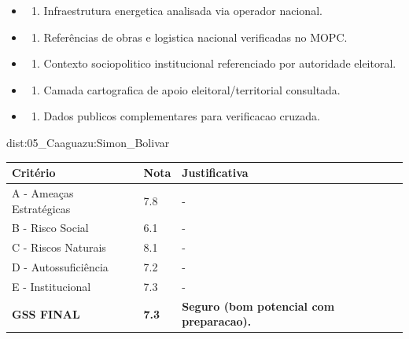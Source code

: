 {\begin{itemize}
\item
  \begin{enumerate}
  \def\labelenumi{\arabic{enumi})}
  \setcounter{enumi}{7}
  \tightlist
  \item
    Infraestrutura energetica analisada via operador nacional.
  \end{enumerate}
\item
  \begin{enumerate}
  \def\labelenumi{\arabic{enumi})}
  \setcounter{enumi}{8}
  \tightlist
  \item
    Referências de obras e logistica nacional verificadas no MOPC.
  \end{enumerate}
\item
  \begin{enumerate}
  \def\labelenumi{\arabic{enumi})}
  \setcounter{enumi}{9}
  \tightlist
  \item
    Contexto sociopolitico institucional referenciado por autoridade
    eleitoral.
  \end{enumerate}
\item
  \begin{enumerate}
  \def\labelenumi{\arabic{enumi})}
  \setcounter{enumi}{10}
  \tightlist
  \item
    Camada cartografica de apoio eleitoral/\allowbreak territorial consultada.
  \end{enumerate}
\item
  \begin{enumerate}
  \def\labelenumi{\arabic{enumi})}
  \setcounter{enumi}{11}
  \tightlist
  \item
    Dados publicos complementares para verificacao cruzada.
  \end{enumerate}
\end{itemize}}{dist:05_Caaguazu:Simon_Bolivar}
\begin{table}[ht!]
\small \begin{tabular}{p{3.0cm}p{0.8cm}p{6.0cm}} \toprule
\textbf{Critério} & \textbf{Nota} & \textbf{Justificativa} \\ \midrule
A - Ameaças Estratégicas & 7.8 & - \\
B - Risco Social & 6.1 & - \\
C - Riscos Naturais & 8.1 & - \\
D - Autossuficiência & 7.2 & - \\
E - Institucional & 7.3 & - \\
\midrule \textbf{GSS FINAL} & \textbf{7.3} & \textbf{Seguro (bom potencial com preparacao).} \\ \bottomrule \end{tabular}
\end{table}
